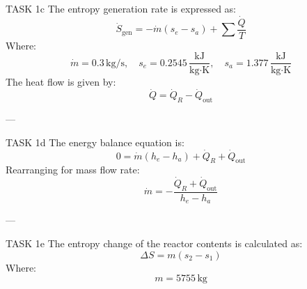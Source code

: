 TASK 1c  
The entropy generation rate is expressed as:  
\[
\dot{S}_{\text{gen}} = -\dot{m}(s_e - s_a) + \sum \frac{\dot{Q}}{T}
\]  
Where:  
\[
\dot{m} = 0.3 \, \text{kg/s}, \quad s_e = 0.2545 \, \frac{\text{kJ}}{\text{kg·K}}, \quad s_a = 1.377 \, \frac{\text{kJ}}{\text{kg·K}}
\]  
The heat flow is given by:  
\[
\dot{Q} = \dot{Q}_R - \dot{Q}_{\text{out}}
\]  

---

TASK 1d  
The energy balance equation is:  
\[
0 = \dot{m}(h_e - h_a) + \dot{Q}_R + \dot{Q}_{\text{out}}
\]  
Rearranging for mass flow rate:  
\[
\dot{m} = -\frac{\dot{Q}_R + \dot{Q}_{\text{out}}}{h_e - h_a}
\]  

---

TASK 1e  
The entropy change of the reactor contents is calculated as:  
\[
\Delta S = m(s_2 - s_1)
\]  
Where:  
\[
m = 5755 \, \text{kg}
\]  